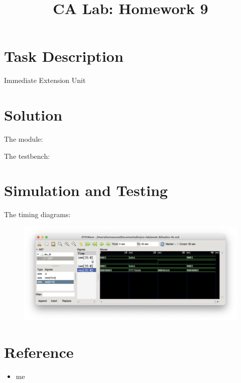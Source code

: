 \documentclass{../../../template}
\title{CA Lab: Homework 9}
\begin{document}
    \maketitle

    \section*{Task Description}

    Immediate Extension Unit

    \section*{Solution}

    The module:

    

    The testbench:

    

    \section*{Simulation and Testing}

    The timing diagrams:

    \begin{figure}[H]
        \includegraphics[width=12cm]{diagram.png}
    \end{figure}

    \section*{Reference}

    \begin{itemize}
        \item me
    \end{itemize}
\end{document}

